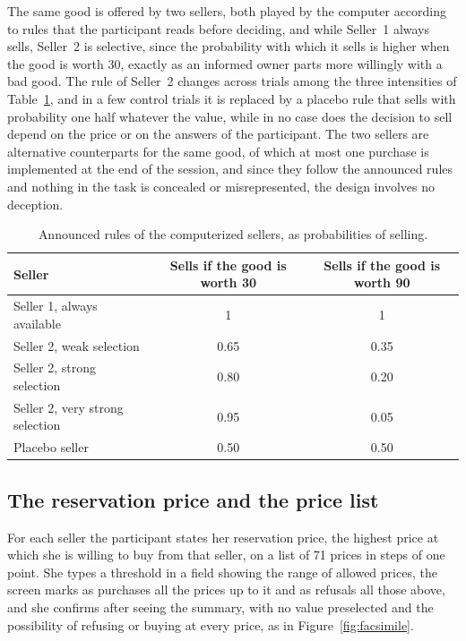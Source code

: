 \documentclass[11pt,a4paper]{article}
\begin{document}
The same good is offered by two sellers, both played by the computer according to rules that the participant reads before deciding, and while Seller~1 always sells, Seller~2 is selective, since the probability with which it sells is higher when the good is worth 30, exactly as an informed owner parts more willingly with a bad good. The rule of Seller~2 changes across trials among the three intensities of Table~\ref{tab:sellers}, and in a few control trials it is replaced by a placebo rule that sells with probability one half whatever the value, while in no case does the decision to sell depend on the price or on the answers of the participant. The two sellers are alternative counterparts for the same good, of which at most one purchase is implemented at the end of the session, and since they follow the announced rules and nothing in the task is concealed or misrepresented, the design involves no deception.

\begin{table}[H]
\centering
\begin{tabular}{@{}lcc@{}}
\toprule
Seller & Sells if the good is worth 30 & Sells if the good is worth 90\\
\midrule
Seller 1, always available & 1 & 1\\
Seller 2, weak selection & 0.65 & 0.35\\
Seller 2, strong selection & 0.80 & 0.20\\
Seller 2, very strong selection & 0.95 & 0.05\\
Placebo seller & 0.50 & 0.50\\
\bottomrule
\end{tabular}
\caption{Announced rules of the computerized sellers, as probabilities of selling.}
\label{tab:sellers}
\end{table}

\subsection{The reservation price and the price list}

For each seller the participant states her reservation price, the highest price at which she is willing to buy from that seller, on a list of 71 prices in steps of one point. She types a threshold in a field showing the range of allowed prices, the screen marks as purchases all the prices up to it and as refusals all those above, and she confirms after seeing the summary, with no value preselected and the possibility of refusing or buying at every price, as in Figure~\ref{fig:facsimile}.
\end{document}
